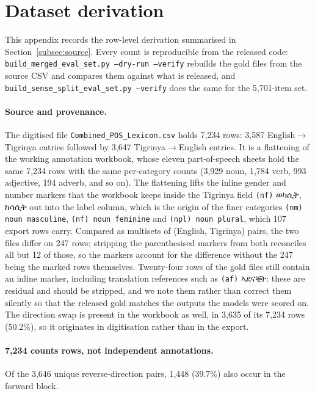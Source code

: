 \documentclass[11pt]{article}
\newcommand{\ti}[1]{{\geezfont #1}}
\newcommand{\ti}[1]{\texttt{[ge'ez]}}
\begin{document}
\section{Dataset derivation}
\label{app:dataset}

This appendix records the row-level derivation summarised in
Section~\ref{subsec:source}. Every count is reproducible from the released
code: \texttt{build\_merged\_eval\_set.py --dry-run --verify} rebuilds the
gold files from the source CSV and compares them against what is released,
and \texttt{build\_sense\_split\_eval\_set.py --verify} does the same for the
5,701-item set.

\paragraph{Source and provenance.} The digitised file
\texttt{Combined\_POS\_Lexicon.csv} holds 7,234 rows: 3,587
English$\rightarrow$Tigrinya entries followed by 3,647
Tigrinya$\rightarrow$English entries. It is a flattening of the working
annotation workbook, whose eleven part-of-speech sheets hold the same 7,234
rows with the same per-category counts (3,929 noun, 1,784 verb, 993
adjective, 194 adverb, and so on). The flattening lifts the inline
gender and number markers that the workbook keeps inside the Tigrinya field \texttt{(nf)} \ti{ወካሲት}, \ti{ከሳሲት} out into the label column, which
is the origin of the finer categories \texttt{(nm) noun masculine},
\texttt{(nf) noun feminine} and \texttt{(npl) noun plural}, which 107 export
rows carry. Compared as multisets of (English, Tigrinya) pairs, the two
files differ on 247 rows; stripping the parenthesised markers from both
reconciles all but 12 of those, so the markers account for the difference
without the 247 being the marked rows themselves. Twenty-four rows of the
gold files still contain an inline marker, including translation references
such as \texttt{(af)} \ti{ኣደናቒት}: these are residual and should be stripped,
and we note them rather than correct them silently so that the released gold
matches the outputs the models were scored on. The direction swap is
present in the workbook as well, in 3,635 of its 7,234 rows (50.2\%), so it
originates in digitisation rather than in the export.

\paragraph{7,234 counts rows, not independent annotations.} Of the 3,646
unique reverse-direction pairs, 1,448 (39.7\%) also occur in the forward
block.
\end{document}
